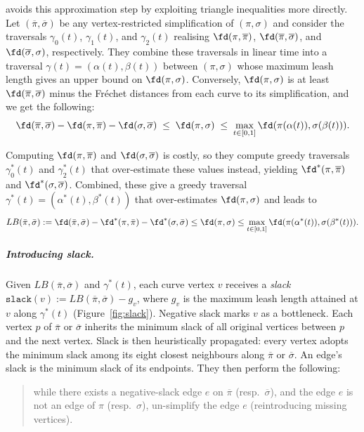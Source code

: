 \documentclass[english, thm-restate, notab]{lipics-v2021}
\begin{document}
\cite{harpeled_et_al:LIPIcs.SoCG.2025.54} avoids this approximation step by exploiting triangle inequalities more directly. 
Let $(\overline{\pi},\overline{\sigma})$ be any vertex-restricted simplification of $(\pi,\sigma)$ and consider the traversals $\gamma_0(t)$, $\gamma_1(t)$, and $\gamma_2(t)$ realising $\fd(\pi,\overline{\pi})$, $\fd(\overline{\pi},\overline{\sigma})$, and $\fd(\overline{\sigma},\sigma)$, respectively. 
They combine these traversals in linear time into a traversal $\gamma(t)=(\alpha(t),\beta(t))$ between $(\pi,\sigma)$ whose maximum leash length gives an upper bound on $\fd(\pi,\sigma)$. 
Conversely, $\fd(\pi,\sigma)$ is at least $\fd(\overline{\pi},\overline{\sigma})$ minus the Fréchet distances from each curve to its simplification, and we get the following:
\[
\fd(\overline{\pi},\overline{\sigma}) - \fd(\pi,\overline{\pi}) - \fd(\sigma,\overline{\sigma})
\;\leq\; \fd(\pi,\sigma)
\;\leq\;
\max_{t\in[0,1]} \fd(\pi(\alpha(t)),\sigma(\beta(t))).
\]

Computing $\fd(\pi,\overline{\pi})$ and $\fd(\sigma,\overline{\sigma})$ is costly, so they compute greedy traversals $\gamma_0^*(t)$ and $\gamma_2^*(t)$ that over-estimate these values instead, yielding $\fd^*(\pi,\overline{\pi})$ and $\fd^*(\sigma,\overline{\sigma})$. 
Combined, these give a greedy traversal $\gamma^*(t)=(\alpha^*(t),\beta^*(t))$ that over-estimates $\fd(\pi,\sigma)$ and leads to
\begin{equation}
\label{eq:inequality}
LB(\bar\pi,\bar\sigma)
:=\fd(\bar\pi,\bar\sigma)-\fd^*(\pi,\bar\pi)-\fd^*(\sigma,\bar\sigma)
\le \fd(\pi,\sigma)
\le \max_{t\in[0,1]}\fd(\pi(\alpha^*(t)),\sigma(\beta^*(t))).
\end{equation}

\subparagraph{Introducing slack.}
Given $LB(\overline{\pi},\overline{\sigma})$ and $\gamma^*(t)$, each curve vertex $v$ receives a \emph{slack} $
\texttt{slack}(v) := LB(\overline{\pi},\overline{\sigma}) - g_v$,
where $g_v$ is the maximum leash length attained at $v$ along $\gamma^*(t)$ (Figure~\ref{fig:slack}).  
Negative slack marks $v$ as a bottleneck.  
Each vertex $p$ of $\overline{\pi}$ or $\overline{\sigma}$ inherits the minimum slack of all original vertices between $p$ and the next vertex.  
Slack is then heuristically propagated: every vertex adopts the minimum slack among its eight closest neighbours along $\overline{\pi}$ or $\overline{\sigma}$. 
An edge’s slack is the minimum slack of its endpoints.  
They then perform the following:

\begin{quote}
    while there exists a negative-slack edge $e$ on $\overline{\pi}$ (resp.\ $\overline{\sigma}$), and the edge $e$ is not an edge of $\pi$ (resp.\ $\sigma$), un-simplify the edge $e$ (reintroducing missing vertices).
\end{quote}
\end{document}
